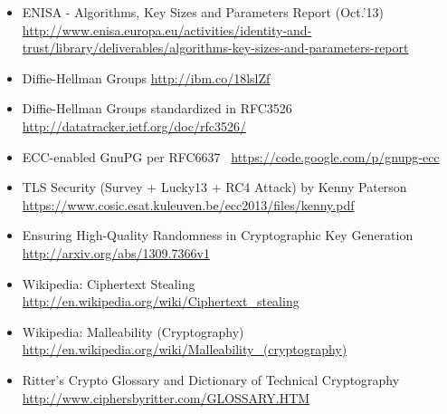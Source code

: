\begin{itemize}
  \item ENISA - Algorithms, Key Sizes and Parameters Report (Oct.'13) \url{http://www.enisa.europa.eu/activities/identity-and-trust/library/deliverables/algorithms-key-sizes-and-parameters-report}
  \item Diffie-Hellman Groups \url{http://ibm.co/18lslZf}
  \item Diffie-Hellman Groups standardized in RFC3526~\cite{rfc3526} \url{http://datatracker.ietf.org/doc/rfc3526/}
  \item ECC-enabled GnuPG per RFC6637~\cite{rfc6637} \url{https://code.google.com/p/gnupg-ecc}
  \item TLS Security (Survey + Lucky13 + RC4 Attack) by Kenny Paterson \url{https://www.cosic.esat.kuleuven.be/ecc2013/files/kenny.pdf}
  \item Ensuring High-Quality Randomness in Cryptographic Key Generation \url{http://arxiv.org/abs/1309.7366v1}
  \item Wikipedia: Ciphertext Stealing \url{http://en.wikipedia.org/wiki/Ciphertext_stealing}
  \item Wikipedia: Malleability (Cryptography) \url{http://en.wikipedia.org/wiki/Malleability_(cryptography)}
  \item Ritter's Crypto Glossary and Dictionary of Technical Cryptography \url{http://www.ciphersbyritter.com/GLOSSARY.HTM}
\end{itemize}
